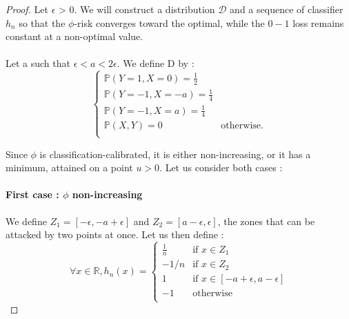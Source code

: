 \begin{proof}

Let $\epsilon$ > 0. We will construct a distribution $\mathcal{D}$ and a sequence of classifier $h_n$ so that the $\phi$-risk converges toward the optimal, while the $0-1$ loss remains constant at a non-optimal value.

\paragraph{}Let a such that $\epsilon < a < 2 \epsilon$. We define D by :
\[
\left\{ \begin{array}{ll}
\mathbb{P}(Y=1, X=0) = \frac{1}{2} & \\
\mathbb{P}(Y=-1, X=-a) = \frac{1}{4} & \\
\mathbb{P}(Y=-1, X=a) = \frac{1}{4} & \\
\mathbb{P}(X, Y) = 0 & \mbox{otherwise.} \\
\end{array} \right.
\]

Since $\phi$ is classification-calibrated, it is either non-increasing, or it has a minimum, attained on a point $u>0$. Let us consider both cases :

\paragraph{First case : $\phi$ non-increasing}

We define $Z_1 = [-\epsilon, -a + \epsilon]$ and $Z_2 = [a-\epsilon, \epsilon]$, the zones that can be attacked by two points at once.
Let us then define : 
\[
\forall x \in \mathbb{R}, h_n(x) = \left\{ \begin{array}{ll}
\frac{1}{n} & \mbox{if } x \in Z_1 \\
-1/n & \mbox{if } x \in Z_2 \\
1 & \mbox{if }x \in [-a+\epsilon, a-\epsilon] \\
-1 & \mbox{otherwise} \\
\end{array} \right.
\]


\end{proof}
